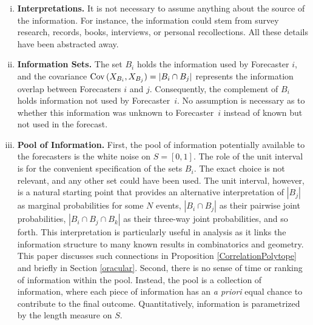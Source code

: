 \documentclass[12pt]{article}
\theoremstyle{definition}
\theoremstyle{definition}
\def\Cov{{\rm Cov}\,}
\begin{document}
\begin{enumerate}[(i)]
\item {\bf Interpretations.} It is not necessary to assume anything 
about the source of the information.  For instance, the information 
could stem from survey research, records, books, 
interviews, or personal recollections.  All these details have 
been abstracted away. \vspace{-0.5em}

\item {\bf Information Sets.} The set $B_i$ holds the information used
by Forecaster $i$, and the covariance $\Cov (X_{B_i} , X_{B_j}) = |B_{i} \cap B_{j}|$
represents the information overlap between Forecasters $i$ and
$j$.
Consequently, the complement of $B_i$ holds information not used by
Forecaster~$i$.  No assumption is necessary as to whether this
information was unknown to Forecaster~$i$ instead of known but not
used in the forecast. \vspace{-0.5em}


\item {\bf Pool of Information.} First, the pool of
information potentially available to the forecasters is the white
noise on $S = [0,1]$. The role of the unit interval
is for the convenient specification of the sets $B_i$.
The exact choice is not relevant, and
any other set could have been used. The unit interval, however, is a
natural starting point that provides an alternative interpretation of $|B_j|$ as marginal probabilities for some $N$ events, $|B_i \cap B_j|$ as their pairwise joint probabilities, $|B_i \cap B_j \cap B_k|$ as their three-way joint probabilities,
and so forth.  This interpretation is particularly useful in analysis as it links the
information structure to many known results in combinatorics and geometry. This paper discusses such connections in Proposition \ref{CorrelationPolytope} and briefly in Section \ref{oracular}. Second, there is
no sense of time or ranking of information within the
pool. Instead, the pool is a collection of information, where each
piece of information has an {\em a priori} equal chance to contribute
to the final outcome.  Quantitatively, information is parametrized
by the length measure on $S$. \label{item:pool} \vspace{-0.5em}



\end{enumerate}
\end{document}
